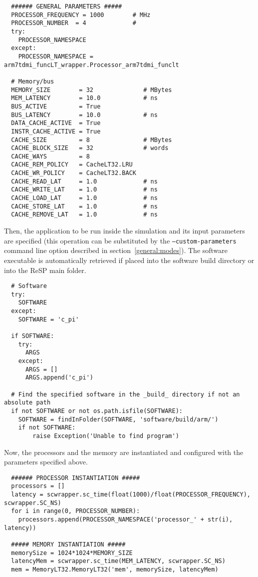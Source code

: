 \scriptsize
\begin{verbatim}
  ###### GENERAL PARAMETERS #####
  PROCESSOR_FREQUENCY = 1000        # MHz
  PROCESSOR_NUMBER  = 4             #
  try:
    PROCESSOR_NAMESPACE
  except:
    PROCESSOR_NAMESPACE = arm7tdmi_funcLT_wrapper.Processor_arm7tdmi_funclt

  # Memory/bus
  MEMORY_SIZE        = 32              # MBytes
  MEM_LATENCY        = 10.0            # ns
  BUS_ACTIVE         = True
  BUS_LATENCY        = 10.0            # ns
  DATA_CACHE_ACTIVE  = True
  INSTR_CACHE_ACTIVE = True
  CACHE_SIZE         = 8               # MBytes
  CACHE_BLOCK_SIZE   = 32              # words
  CACHE_WAYS         = 8
  CACHE_REM_POLICY   = CacheLT32.LRU
  CACHE_WR_POLICY    = CacheLT32.BACK
  CACHE_READ_LAT     = 1.0             # ns
  CACHE_WRITE_LAT    = 1.0             # ns
  CACHE_LOAD_LAT     = 1.0             # ns
  CACHE_STORE_LAT    = 1.0             # ns
  CACHE_REMOVE_LAT   = 1.0             # ns
\end{verbatim}
\normalsize

\indent Then, the application to be run inside the simulation and its input parameters are specified (this operation can be substituted by the \texttt{--custom-parameters} command line option described in section~\ref{general:modes}). The software executable is automatically retrieved if placed into the software build directory or into the ReSP main folder.

\scriptsize
\begin{verbatim}
  # Software
  try:
    SOFTWARE
  except:
    SOFTWARE = 'c_pi'

  if SOFTWARE:
    try:
      ARGS
    except:
      ARGS = []
      ARGS.append('c_pi')

  # Find the specified software in the _build_ directory if not an absolute path
  if not SOFTWARE or not os.path.isfile(SOFTWARE):
    SOFTWARE = findInFolder(SOFTWARE, 'software/build/arm/')
    if not SOFTWARE:
        raise Exception('Unable to find program')
\end{verbatim}
\normalsize

\indent Now, the processors and the memory are instantiated and configured with the parameters specified above.

\scriptsize
\begin{verbatim}
  ###### PROCESSOR INSTANTIATION #####
  processors = []
  latency = scwrapper.sc_time(float(1000)/float(PROCESSOR_FREQUENCY),  scwrapper.SC_NS)
  for i in range(0, PROCESSOR_NUMBER):
    processors.append(PROCESSOR_NAMESPACE('processor_' + str(i), latency))

  ##### MEMORY INSTANTIATION #####
  memorySize = 1024*1024*MEMORY_SIZE
  latencyMem = scwrapper.sc_time(MEM_LATENCY, scwrapper.SC_NS)
  mem = MemoryLT32.MemoryLT32('mem', memorySize, latencyMem)
\end{verbatim}
\normalsize


